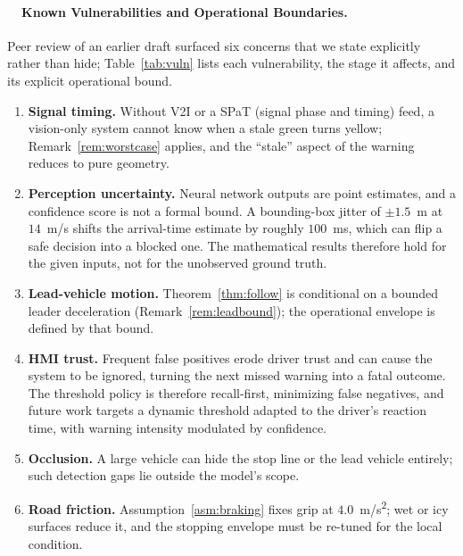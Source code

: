 \documentclass[conference, a4paper]{IEEEtran}
\DeclareRobustCommand{\warnicon}{\faExclamationTriangle\ }
\theoremstyle{plain}
\begin{document}
\paragraph{\warnicon~Known Vulnerabilities and Operational Boundaries.}
Peer review of an earlier draft surfaced six concerns that we state explicitly
rather than hide; Table~\ref{tab:vuln} lists each vulnerability, the stage it
affects, and its explicit operational bound.
\begin{enumerate}
\item \textbf{Signal timing.} Without V2I or a SPaT (signal phase and
  timing) feed, a vision-only system cannot know when a stale green turns
  yellow; Remark~\ref{rem:worstcase} applies, and the ``stale'' aspect of the
  warning reduces to pure geometry.
\item \textbf{Perception uncertainty.} Neural network outputs are point
  estimates, and a confidence score is not a formal bound. A bounding-box
  jitter of $\pm 1.5$~m at $14$~m/s shifts the arrival-time estimate by
  roughly $100$~ms, which can flip a safe decision into a blocked one. The
  mathematical results therefore hold for the given inputs, not for the unobserved
  ground truth.
\item \textbf{Lead-vehicle motion.} Theorem~\ref{thm:follow} is conditional
  on a bounded leader deceleration (Remark~\ref{rem:leadbound}); the
  operational envelope is defined by that bound.
\item \textbf{HMI trust.} Frequent false positives erode driver trust and can
  cause the system to be ignored, turning the next missed warning into a
  fatal outcome. The threshold policy is therefore recall-first, minimizing
  false negatives, and future work targets a dynamic threshold adapted to the
  driver's reaction time, with warning intensity modulated by confidence.
\item \textbf{Occlusion.} A large vehicle can hide the stop line or the lead
  vehicle entirely; such detection gaps lie outside the model's scope.
\item \textbf{Road friction.} Assumption~\ref{asm:braking} fixes grip at
  $4.0$~\si{m/s^2}; wet or icy surfaces reduce it, and the stopping envelope
  must be re-tuned for the local condition.
\end{enumerate}
\end{document}

